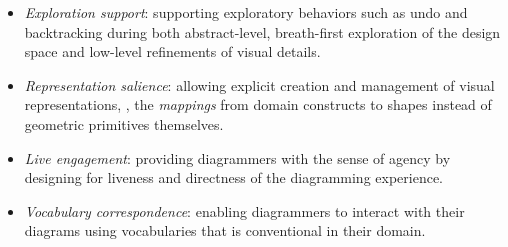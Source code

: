 \begin{itemize} 
    \item \textit{Exploration support}: supporting exploratory behaviors such as undo and backtracking during both abstract-level, breath-first exploration of the design space and low-level refinements of visual details.
    \item \textit{Representation salience}: allowing explicit creation and management of visual representations, \ie, the \emph{mappings} from domain constructs to shapes instead of geometric primitives themselves.
    \item \textit{Live engagement}: providing diagrammers with the sense of agency by designing for liveness and directness of the diagramming experience. 
    \item \textit{Vocabulary correspondence}: enabling diagrammers to interact with their diagrams using vocabularies that is conventional in their domain.
\end{itemize}
